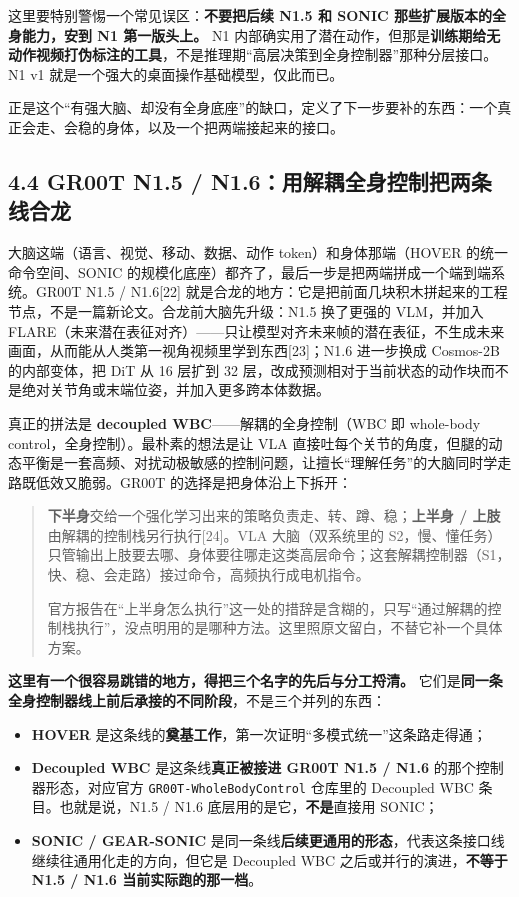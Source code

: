 \documentclass[
  chinese,
]{ctexart}
\providecommand{\tightlist}{%
  \setlength{\itemsep}{0pt}\setlength{\parskip}{0pt}}
\begin{document}
这里要特别警惕一个常见误区：\textbf{不要把后续 N1.5 和 SONIC
那些扩展版本的全身能力，安到 N1 第一版头上。} N1
内部确实用了潜在动作，但那是\textbf{训练期给无动作视频打伪标注的工具}，不是推理期``高层决策到全身控制器''那种分层接口。N1
v1 就是一个强大的桌面操作基础模型，仅此而已。

正是这个``有强大脑、却没有全身底座''的缺口，定义了下一步要补的东西：一个真正会走、会稳的身体，以及一个把两端接起来的接口。

\subsection{4.4 GR00T N1.5 /
N1.6：用解耦全身控制把两条线合龙}\label{gr00t-n1.5-n1.6ux7528ux89e3ux8026ux5168ux8eabux63a7ux5236ux628aux4e24ux6761ux7ebfux5408ux9f99}

大脑这端（语言、视觉、移动、数据、动作 token）和身体那端（HOVER
的统一命令空间、SONIC
的规模化底座）都齐了，最后一步是把两端拼成一个端到端系统。GR00T N1.5 /
N1.6{[}22{]}
就是合龙的地方：它是把前面几块积木拼起来的工程节点，不是一篇新论文。合龙前大脑先升级：N1.5
换了更强的 VLM，并加入
FLARE（未来潜在表征对齐）------只让模型对齐未来帧的潜在表征，不生成未来画面，从而能从人类第一视角视频里学到东西{[}23{]}；N1.6
进一步换成 Cosmos-2B 的内部变体，把 DiT 从 16 层扩到 32
层，改成预测相对于当前状态的动作块而不是绝对关节角或末端位姿，并加入更多跨本体数据。

真正的拼法是 \textbf{decoupled WBC}------解耦的全身控制（WBC 即
whole-body control，全身控制）。最朴素的想法是让 VLA
直接吐每个关节的角度，但腿的动态平衡是一套高频、对扰动极敏感的控制问题，让擅长``理解任务''的大脑同时学走路既低效又脆弱。GR00T
的选择是把身体沿上下拆开：

\begin{quote}
\textbf{下半身}交给一个强化学习出来的策略负责走、转、蹲、稳；\textbf{上半身
/ 上肢}由解耦的控制栈另行执行{[}24{]}。VLA 大脑（双系统里的
S2，慢、懂任务）只管输出上肢要去哪、身体要往哪走这类高层命令；这套解耦控制器（S1，快、稳、会走路）接过命令，高频执行成电机指令。

官方报告在``上半身怎么执行''这一处的措辞是含糊的，只写``通过解耦的控制栈执行''，没点明用的是哪种方法。这里照原文留白，不替它补一个具体方案。
\end{quote}

\textbf{这里有一个很容易跳错的地方，得把三个名字的先后与分工捋清。}
它们是\textbf{同一条全身控制器线上前后承接的不同阶段}，不是三个并列的东西：

\begin{itemize}
\tightlist
\item
  \textbf{HOVER}
  是这条线的\textbf{奠基工作}，第一次证明``多模式统一''这条路走得通；
\item
  \textbf{Decoupled WBC} 是这条线\textbf{真正被接进 GR00T N1.5 / N1.6}
  的那个控制器形态，对应官方 \texttt{GR00T-WholeBodyControl} 仓库里的
  Decoupled WBC 条目。也就是说，N1.5 / N1.6
  底层用的是它，\textbf{不是}直接用 SONIC；
\item
  \textbf{SONIC / GEAR-SONIC}
  是同一条线\textbf{后续更通用的形态}，代表这条接口线继续往通用化走的方向，但它是
  Decoupled WBC 之后或并行的演进，\textbf{不等于 N1.5 / N1.6
  当前实际跑的那一档}。
\end{itemize}
\end{document}
